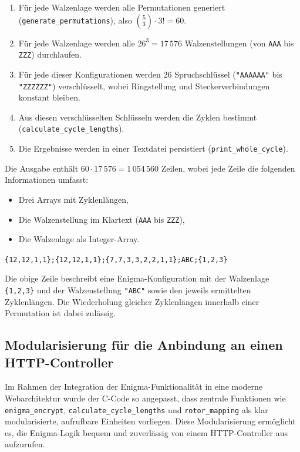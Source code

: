 \documentclass[12pt, ngerman, a4paper, numbers=noenddot]{article}
\begin{document}
\begin{enumerate}
	\item Für jede Walzenlage werden alle Permutationen generiert \newline(\lstinline|generate_permutations|), also \(\binom{5}{3} \cdot 3! = 60\).
	\item Für jede Walzenlage werden alle $26^3 = 17\,576$ Walzenstellungen (von \lstinline|AAA| bis \lstinline|ZZZ|) durchlaufen.
	\item Für jede dieser Konfigurationen werden 26 Spruchschlüssel (\lstinline|"AAAAAA"| bis \newline\lstinline|"ZZZZZZ"|) verschlüsselt, wobei Ringstellung und Steckerverbindungen konstant bleiben.
	\item Aus diesen verschlüsselten Schlüsseln werden die Zyklen bestimmt \newline(\lstinline|calculate_cycle_lengths|).
	\item Die Ergebnisse werden in einer Textdatei persistiert (\lstinline|print_whole_cycle|).
\end{enumerate}

Die Ausgabe enthält $60 \cdot 17\,576 = 1\,054\,560$ Zeilen, wobei jede Zeile die folgenden Informationen umfasst:

\begin{itemize}
	\item Drei Arrays mit Zyklenlängen,
	\item Die Walzenstellung im Klartext (\lstinline|AAA| bis \lstinline|ZZZ|),
	\item Die Walzenlage als Integer-Array.
\end{itemize}

\lstinline|{12,12,1,1};{12,12,1,1};{7,7,3,3,2,2,1,1};ABC;{1,2,3}|

Die obige Zeile beschreibt eine Enigma-Konfiguration mit der Walzenlage \lstinline|{1,2,3}| und der Walzenstellung \lstinline|"ABC"| sowie den jeweils ermittelten Zyklenlängen. Die Wiederholung gleicher Zyklenlängen innerhalb einer Permutation ist dabei zulässig.

\newpage

\subsection{Modularisierung für die Anbindung an einen HTTP-Controller}  
\label{subsec:c_api_prep}

Im Rahmen der Integration der Enigma-Funktionalität in eine moderne Web\-architektur wurde der C-Code so angepasst, dass zentrale Funktionen wie \lstinline|enigma_encrypt|, \lstinline|calculate_cycle_lengths| und \lstinline|rotor_mapping| als klar modularisierte, aufrufbare Einheiten vorliegen. Diese Modularisierung ermöglicht es, die Enigma-Logik bequem und zuverlässig von einem HTTP-Controller aus aufzurufen.
\end{document}
